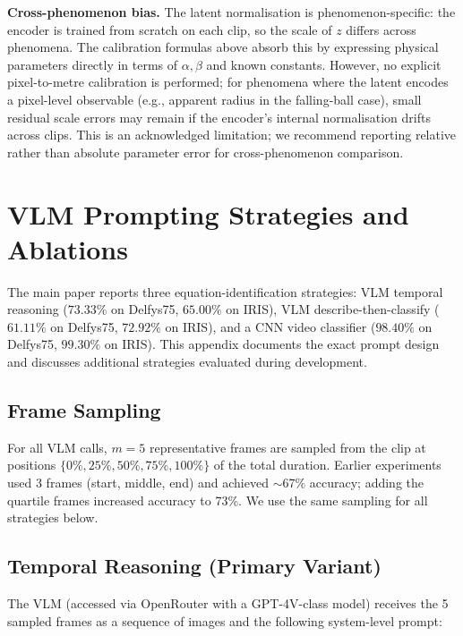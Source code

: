 \documentclass[runningheads]{llncs}
\begin{document}
\textbf{Cross-phenomenon bias.} The latent normalisation is
phenomenon-specific: the encoder is trained from scratch on each clip, so
the scale of $z$ differs across phenomena. The calibration formulas above
absorb this by expressing physical parameters directly in terms of $\alpha,
\beta$ and known constants. However, no explicit pixel-to-metre calibration
is performed; for phenomena where the latent encodes a pixel-level observable
(e.g., apparent radius in the falling-ball case), small residual scale errors
may remain if the encoder's internal normalisation drifts across clips.
This is an acknowledged limitation; we recommend reporting relative rather
than absolute parameter error for cross-phenomenon comparison.


\section{VLM Prompting Strategies and Ablations}
\label{app:vlm_prompting}

The main paper reports three equation-identification strategies: VLM temporal reasoning ($73.33\%$ on Delfys75, $65.00\%$ on IRIS), VLM describe-then-classify ($61.11\%$ on Delfys75, $72.92\%$ on IRIS), and a CNN video classifier ($98.40\%$ on Delfys75, $99.30\%$ on IRIS). This appendix documents the exact prompt design and discusses additional strategies evaluated during development.

\subsection{Frame Sampling}
\label{app:frame_sampling}

For all VLM calls, $m = 5$ representative frames are sampled from the clip
at positions $\{0\%, 25\%, 50\%, 75\%, 100\%\}$ of the total duration.
Earlier experiments used 3 frames (start, middle, end) and achieved $\sim$67\%
accuracy; adding the quartile frames increased accuracy to 73\%.  We use
the same sampling for all strategies below.

\subsection{Temporal Reasoning (Primary Variant)}
\label{app:vlm_temporal}

The VLM (accessed via OpenRouter with a GPT-4V-class model) receives the
5 sampled frames as a sequence of images and the following system-level
prompt:
\end{document}
